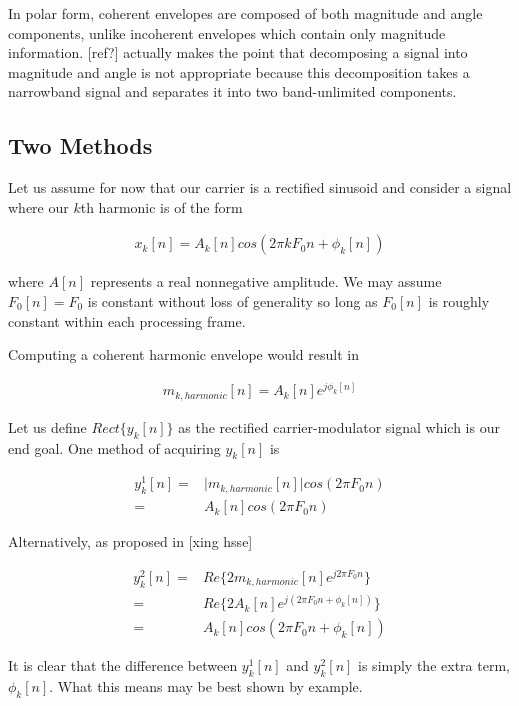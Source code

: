 \documentclass [11pt, proquest] {uwthesis}[2015/03/03]
\begin{document}
In polar form, coherent envelopes are composed of both magnitude and angle components, unlike incoherent envelopes which contain only magnitude information.  [ref?] actually makes the point that decomposing a signal into magnitude and angle is not appropriate because this decomposition takes a narrowband signal and separates it into two band-unlimited components.

\subsection{Two Methods}

Let us assume for now that our carrier is a rectified sinusoid and consider a signal where our $k$th harmonic is of the form

\begin{align}
x_k[n] = A_k[n]cos(2\pi kF_0n + \phi_k[n])
\end{align}

where $A[n]$ represents a real nonnegative amplitude.  We may assume $F_0[n] = F_0$ is constant without loss of generality so long as $F_0[n]$ is roughly constant within each processing frame.

Computing a coherent harmonic envelope would result in

\begin{align}
m_{k,harmonic}[n] = A_k[n]e^{j\phi_k[n]}
\end{align}

Let us define $Rect\{y_k[n]\}$ as the rectified carrier-modulator signal which is our end goal.  One method of acquiring $y_k[n]$ is

\begin{align}
\label{eq:realVSmag1}
y_k^1[n] =& \vert m_{k,harmonic}[n] \vert cos(2\pi F_0 n) \\
=& A_k[n] cos(2\pi F_0 n) \nonumber
\end{align}

Alternatively, as proposed in [xing hsse]

\begin{align}
y_k^2[n] =& Re\{ 2m_{k,harmonic}[n] e^{j2\pi F_0 n} \}  \\
=& Re\{ 2A_k[n]e^{j(2\pi F_0 n + \phi_k[n])} \} \nonumber \\
=& A_k[n]cos(2\pi F_0 n + \phi_k[n]) \nonumber
\end{align}

It is clear that the difference between $y_k^1[n]$ and $y_k^2[n]$ is simply the extra term, $\phi_k[n]$.  What this means may be best shown by example.
\end{document}
